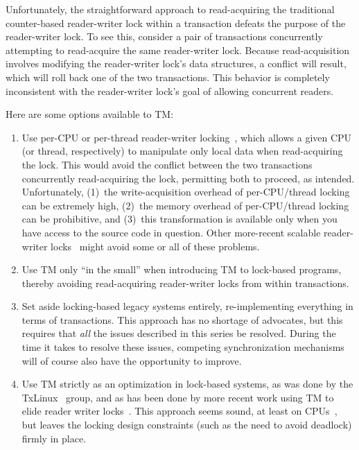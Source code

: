 Unfortunately, the straightforward approach to read-acquiring the
traditional counter-based reader-writer lock within a transaction defeats
the purpose of the reader-writer lock.
To see this, consider a pair of transactions concurrently attempting to
read-acquire the same reader-writer lock.
Because read-acquisition involves modifying the reader-writer lock's
data structures, a conflict will result, which will roll back one of
the two transactions.
This behavior is completely inconsistent with the reader-writer lock's
goal of allowing concurrent readers.

Here are some options available to TM:

\begin{enumerate}
\item	Use per-CPU or per-thread reader-writer
	locking~\cite{WilsonCHsieh92a}, which allows a
	given CPU (or thread, respectively) to manipulate only local
	data when read-acquiring the lock.
	This would avoid the conflict between the two transactions
	concurrently read-acquiring the lock, permitting both to proceed,
	as intended.
	Unfortunately, (1)~the write-acquisition overhead of
	per-CPU/thread locking can be extremely high, (2)~the memory
	overhead of per-CPU/thread locking can be prohibitive, and
	(3)~this transformation is available only when you have access to
	the source code in question.
	Other more-recent scalable
	reader-writer locks~\cite{YossiLev2009SNZIrwlock}
	might avoid some or all of these problems.
\item	Use TM only ``in the small'' when introducing TM to lock-based
	programs, thereby avoiding read-acquiring reader-writer locks
	from within transactions.
\item	Set aside locking-based legacy systems entirely, re-implementing
	everything in terms of transactions.
	This approach has no shortage of advocates, but this requires
	that \emph{all} the issues described in this series be resolved.
	During the time it takes to resolve these issues, competing
	synchronization mechanisms will of course also have the
	opportunity to improve.
\item	Use TM strictly as an optimization in lock-based systems, as was
	done by the TxLinux~\cite{ChistopherJRossbach2007a} group,
	and as has been done by more recent work using TM to elide
	reader writer locks~\cite{PascalFelber2016rwlockElision}.
	This approach seems sound, at least on 
	CPUs~\cite{Le:2015:TMS:3266491.3266500}, but leaves the locking
	design constraints (such as the need to avoid deadlock) firmly
	in place.
\end{enumerate}

